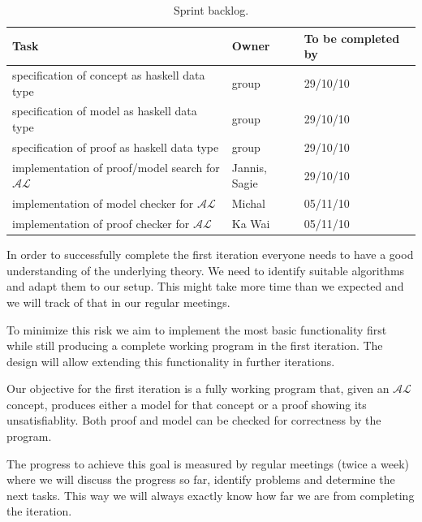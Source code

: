 
\begin{table}
  \caption{Sprint backlog.}
  \begin{tabular}{l|l|l}
    \hline
    \textbf{Task} & \textbf{Owner} & \textbf{To be completed by} \\
    \hline
    specification of concept as haskell data type & group & 29/10/10 \\
    specification of model as haskell data type & group & 29/10/10 \\
    specification of proof as haskell data type & group & 29/10/10 \\
    implementation of proof/model search for $\mathcal{AL}$ & Jannis, Sagie & 29/10/10 \\
    implementation of model checker for $\mathcal{AL}$ & Michal & 05/11/10 \\
    implementation of proof checker for $\mathcal{AL}$ & Ka Wai & 05/11/10
  \end{tabular}
  \label{sprint}
\end{table}


In order to successfully complete the first iteration everyone needs to have a good
understanding of the underlying theory. We need to identify suitable algorithms and
adapt them to our setup. This might take more time than we expected and we will 
track of that in our regular meetings.

To minimize this risk we aim to implement the most basic functionality first while
still producing a complete working program in the first iteration. The design will
allow extending this functionality in further iterations.


Our objective for the first iteration is a fully working program that, given an
$\mathcal{AL}$ concept, produces either a model for that concept or a proof showing its
unsatisfiablity. Both proof and model can be checked for correctness by the program.

The progress to achieve this goal is measured by regular meetings (twice a week) where
we will discuss the progress so far, identify problems and determine the next tasks. This
way we will always exactly know how far we are from completing the iteration.
